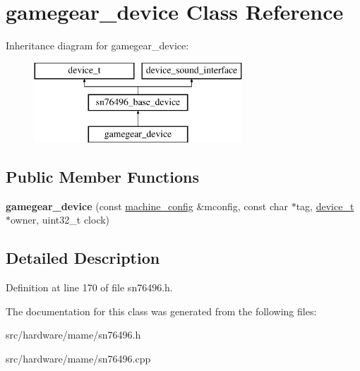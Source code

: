 \hypertarget{classgamegear__device}{\section{gamegear\-\_\-device Class Reference}
\label{classgamegear__device}
}
Inheritance diagram for gamegear\-\_\-device\-:\begin{figure}[H]
\begin{center}
\leavevmode
\includegraphics[height=3.000000cm]{classgamegear__device}
\end{center}
\end{figure}
\subsection*{Public Member Functions}
\begin{DoxyCompactItemize}
\item 
\hypertarget{classgamegear__device_a90e2e7ae5bbdc7e6a0ffc56300447b78}{{\bfseries gamegear\-\_\-device} (const \hyperlink{structmachine__config}{machine\-\_\-config} \&mconfig, const char $\ast$tag, \hyperlink{classdevice__t}{device\-\_\-t} $\ast$owner, uint32\-\_\-t clock)}\label{classgamegear__device_a90e2e7ae5bbdc7e6a0ffc56300447b78}

\end{DoxyCompactItemize}


\subsection{Detailed Description}


Definition at line 170 of file sn76496.\-h.



The documentation for this class was generated from the following files\-:\begin{DoxyCompactItemize}
\item 
src/hardware/mame/sn76496.\-h\item 
src/hardware/mame/sn76496.\-cpp\end{DoxyCompactItemize}
